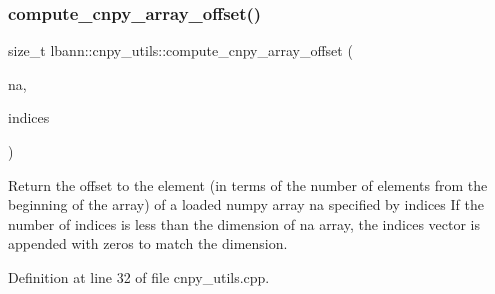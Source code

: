 \subsubsection{\texorpdfstring{compute\+\_\+cnpy\+\_\+array\+\_\+offset()}{compute\_cnpy\_array\_offset()}}
{\footnotesize\ttfamily size\+\_\+t lbann\+::cnpy\+\_\+utils\+::compute\+\_\+cnpy\+\_\+array\+\_\+offset (\begin{DoxyParamCaption}\item[{const cnpy\+::\+Npy\+Array \&}]{na,  }\item[{std\+::vector$<$ size\+\_\+t $>$}]{indices }\end{DoxyParamCaption})}

Return the offset to the element (in terms of the number of elements from the beginning of the array) of a loaded numpy array na specified by indices If the number of indices is less than the dimension of na array, the indices vector is appended with zeros to match the dimension. 

Definition at line 32 of file cnpy\+\_\+utils.\+cpp.


